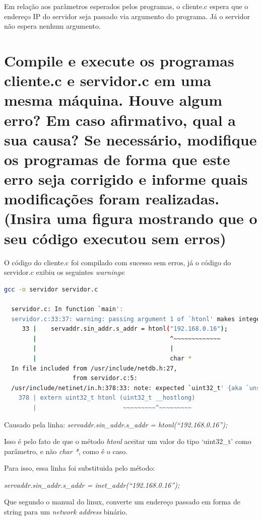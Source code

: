 \documentclass[12pt,a4paper]{report}
\begin{document}
\bigbreak

Em relação aos parâmetros esperados pelos programas, o cliente.c espera que o endereço IP do servidor seja passado via argumento do programa. Já o servidor não espera nenhum argumento.

\section{Compile e execute os programas cliente.c e servidor.c em uma mesma máquina. Houve algum
erro? Em caso afirmativo, qual a sua causa? Se necessário, modifique os programas de forma
que este erro seja corrigido e informe quais modificações foram realizadas. (Insira uma figura
mostrando que o seu código executou sem erros)}

O código do cliente.c foi compilado com sucesso sem erros, já o código do servidor.c exibiu os seguintes \emph{warnings}:

\begin{lstlisting}[language=bash]
  gcc -o servidor servidor.c

  servidor.c: In function `main':
  servidor.c:33:37: warning: passing argument 1 of `htonl' makes integer from pointer without a cast [-Wint-conversion]
     33 |    servaddr.sin_addr.s_addr = htonl("192.168.0.16");
        |                                     ^~~~~~~~~~~~~~
        |                                     |
        |                                     char *
  In file included from /usr/include/netdb.h:27,
                   from servidor.c:5:
  /usr/include/netinet/in.h:378:33: note: expected `uint32_t' {aka `unsigned int'} but argument is of type `char *'
    378 | extern uint32_t htonl (uint32_t __hostlong)
        |                        ~~~~~~~~~^~~~~~~~~~
\end{lstlisting}

Causado pela linha: \emph{servaddr.sin\_addr.s\_addr = htonl(``192.168.0.16'');}

Isso é pelo fato de que o método \emph{htonl} aceitar um valor do tipo `uint32\_t' como parâmetro, e não \emph{char *}, como é o caso. 

\bigbreak

Para isso, essa linha foi substituida pelo método: 

\emph{servaddr.sin\_addr.s\_addr = inet\_addr(``192.168.0.16'');}

Que segundo o manual do linux, converte um endereço passado em forma de string para um \emph{network address} binário.
\end{document}
